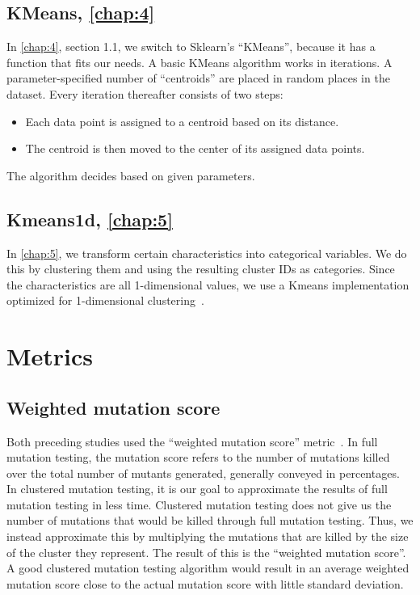 \documentclass[twoside]{uva-inf-bachelor-thesis}
\begin{document}
\subsection{KMeans, \textbf{\cref{chap:4}}}
In \cref{chap:4}, section 1.1, we switch to Sklearn's ``KMeans'', because it has a function that fits our needs. A basic KMeans algorithm works in iterations. A parameter-specified number of ``centroids'' are placed in random places in the dataset. Every iteration thereafter consists of two steps:
\begin{itemize}
    \item Each data point is assigned to a centroid based on its distance.
    \item The centroid is then moved to the center of its assigned data points.
\end{itemize}
The algorithm decides based on given parameters.

\subsection{Kmeans1d, \textbf{\cref{chap:5}}}
In \cref{chap:5}, we transform certain characteristics into categorical variables. We do this by clustering them and using the resulting cluster IDs as categories. Since the characteristics are all 1-dimensional values, we use a Kmeans implementation optimized for 1-dimensional clustering~\cite{kmeans1d}.

\section{Metrics}
\subsection{Weighted mutation score}
Both preceding studies used the ``weighted mutation score'' metric~\cite{Basarat21}. In full mutation testing, the mutation score refers to the number of mutations killed over the total number of mutants generated, generally conveyed in percentages. In clustered mutation testing, it is our goal to approximate the results of full mutation testing in less time. Clustered mutation testing does not give us the number of mutations that would be killed through full mutation testing. Thus, we instead approximate this by multiplying the mutations that are killed by the size of the cluster they represent. The result of this is the ``weighted mutation score''. A good clustered mutation testing algorithm would result in an average weighted mutation score close to the actual mutation score with little standard deviation.
\end{document}
